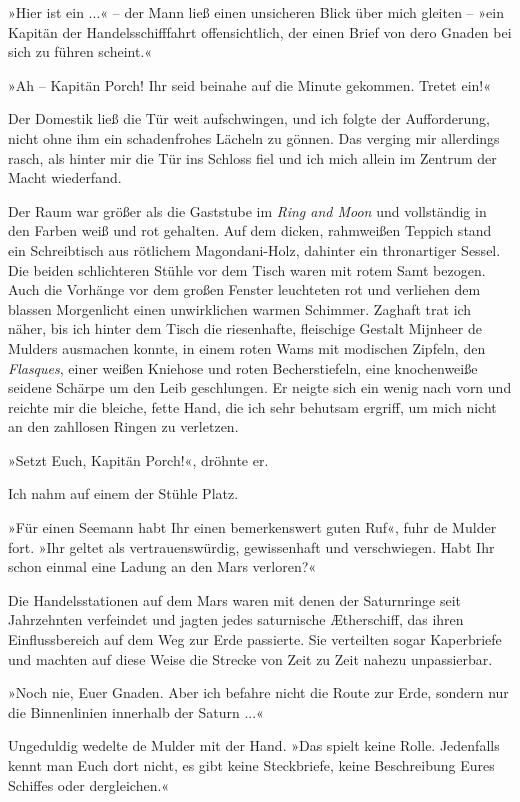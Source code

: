 »Hier ist ein ...« – der Mann ließ einen unsicheren Blick über mich
gleiten – »ein Kapitän der Handelsschifffahrt offensichtlich, der
einen Brief von dero Gnaden bei sich zu führen scheint.«

»Ah – Kapitän Porch! Ihr seid beinahe auf die Minute gekommen.
Tretet ein!«

Der Domestik ließ die Tür weit aufschwingen, und ich folgte der
Aufforderung, nicht ohne ihm ein schadenfrohes Lächeln zu gönnen.
Das verging mir allerdings rasch, als hinter mir die Tür ins
Schloss fiel und ich mich allein im Zentrum der Macht wiederfand.

Der Raum war größer als die Gaststube im \emph{Ring and Moon} und
vollständig in den Farben weiß und rot gehalten. Auf dem dicken,
rahmweißen Teppich stand ein Schreibtisch aus rötlichem
Magondani-Holz, dahinter ein thronartiger Sessel. Die beiden
schlichteren Stühle vor dem Tisch waren mit rotem Samt bezogen.
Auch die Vorhänge vor dem großen Fenster leuchteten rot und
verliehen dem blassen Morgenlicht einen unwirklichen warmen
Schimmer. Zaghaft trat ich näher, bis ich hinter dem Tisch die
riesenhafte, fleischige Gestalt Mijnheer de Mulders ausmachen
konnte, in einem roten Wams mit modischen Zipfeln, den
\emph{Flasques}, einer weißen Kniehose und roten Becherstiefeln,
eine knochenweiße seidene Schärpe um den Leib geschlungen. Er
neigte sich ein wenig nach vorn und reichte mir die bleiche, fette
Hand, die ich sehr behutsam ergriff, um mich nicht an den zahllosen
Ringen zu verletzen.

\bigpar

»Setzt Euch, Kapitän Porch!«, dröhnte er.

Ich nahm auf einem der Stühle Platz.

»Für einen Seemann habt Ihr einen bemerkenswert guten Ruf«, fuhr de
Mulder fort. »Ihr geltet als vertrauenswürdig, gewissenhaft und
verschwiegen. Habt Ihr schon einmal eine Ladung an den Mars
verloren?«

Die Handelsstationen auf dem Mars waren mit denen der Saturnringe
seit Jahrzehnten verfeindet und jagten jedes saturnische
Ætherschiff, das ihren Einflussbereich auf dem Weg zur Erde
passierte. Sie verteilten sogar Kaperbriefe und machten auf diese
Weise die Strecke von Zeit zu Zeit nahezu unpassierbar.

»Noch nie, Euer Gnaden. Aber ich befahre nicht die Route zur Erde,
sondern nur die Binnenlinien innerhalb der Saturn ...«

Ungeduldig wedelte de Mulder mit der Hand. »Das spielt keine Rolle.
Jedenfalls kennt man Euch dort nicht, es gibt keine Steckbriefe,
keine Beschreibung Eures Schiffes oder dergleichen.«

